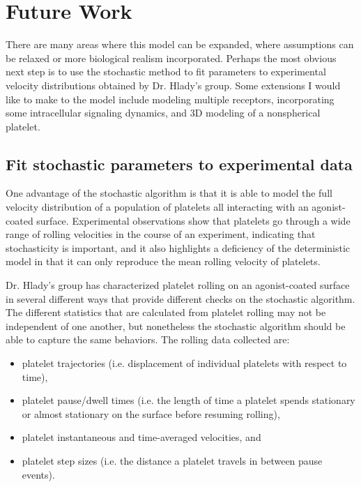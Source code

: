 
\chapter{Future Work}
\label{cha:future-work}

There are many areas where this model can be expanded, where
assumptions can be relaxed or more biological realism
incorporated. Perhaps the most obvious next step is to use the
stochastic method to fit parameters to experimental velocity
distributions obtained by Dr. Hlady's group. Some extensions I would like
to make to the model include modeling multiple receptors,
incorporating some intracellular signaling dynamics, and 3D modeling
of a nonspherical platelet. 

\section{Fit stochastic parameters to experimental data}
\label{sec:fit-stoch-param}

One advantage of the stochastic algorithm is that it is able to
model the full velocity distribution of a population of platelets all
interacting with an agonist-coated surface. Experimental observations
show that platelets go through a wide range of rolling velocities in
the course of an experiment, indicating that stochasticity is
important, and it also highlights a deficiency of the deterministic
model in that it can only reproduce the mean rolling velocity of
platelets.

Dr. Hlady's group has characterized platelet rolling on an
agonist-coated surface in several different ways that provide
different checks on the stochastic algorithm. The different statistics
that are calculated from platelet rolling may not be independent
of one another, but nonetheless the stochastic algorithm should be
able to capture the same behaviors. The rolling data collected are:
\begin{itemize}
\item platelet trajectories (i.e. displacement of individual platelets
  with respect to time),
\item platelet pause/dwell times (i.e. the length of time a platelet
  spends stationary or almost stationary on the surface before
  resuming rolling),
\item platelet instantaneous and time-averaged velocities, and
\item platelet step sizes (i.e. the distance a platelet travels in
  between pause events).
\end{itemize}

